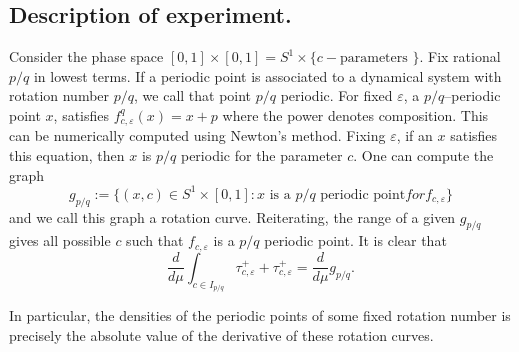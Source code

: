 \documentclass[10pt]{amsart}
\numberwithin{equation}{section}     %
\renewcommand{\epsilon}{\varepsilon}
\begin{document}

\subsection{Description of experiment.}
Consider the phase space $[0,1] \times [0,1] = S^1 \times  \{ c - \text{parameters } \}$. Fix rational $p/q$ in lowest terms. If a periodic point is associated to a dynamical system with rotation number $p/q$, we call that point $p/q$ periodic. For fixed $\varepsilon$, a $p/q$--periodic point $x$, satisfies $f_{c,\varepsilon}^q(x) = x + p$ where the power denotes composition. This can be numerically computed using Newton's method. Fixing $\epsilon$, if an $x$ satisfies this equation, then $x$ is $p/q$ periodic for the parameter $c$. One can compute the graph $$g_{p/q} := \{(x,c) \in S^1 \times [0,1]: x \text{ is a } p/q \text{ periodic point} for f_{c,\epsilon}\}$$ and we call this graph a  rotation curve. Reiterating, the range of a given $g_{p/q}$ gives all possible $c$ such that $f_{c,\varepsilon}$ is a $p/q$ periodic point. It is clear that $$\frac{d}{d\mu} \int_{c \in I_{p/q}} \tau_{c,\epsilon}^+ + \tau_{c,\epsilon}^+ = \frac{d}{d\mu} g_{p/q}.$$

In particular, the densities of the  periodic points of some fixed rotation number is precisely the absolute value of the derivative of these rotation curves. 
\end{document}
